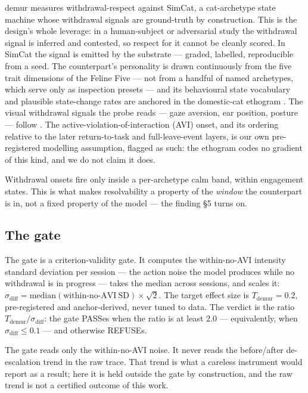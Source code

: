 \documentclass{article}
\begin{document}
demur measures withdrawal-respect against SimCat, a cat-archetype state machine whose withdrawal signals are ground-truth by construction. This is the design's whole leverage: in a human-subject or adversarial study the withdrawal signal is inferred and contested, so respect for it cannot be cleanly scored. In SimCat the signal is emitted by the substrate --- graded, labelled, reproducible from a seed. The counterpart's personality is drawn continuously from the five trait dimensions of the Feline Five \citep{litchfield2017feline} --- not from a handful of named archetypes, which serve only as inspection presets --- and its behavioural state vocabulary and plausible state-change rates are anchored in the domestic-cat ethogram \citep{kappel2024ethogram}. The visual withdrawal signals the probe reads --- gaze aversion, ear position, posture --- follow \citet{deputte2021heads}. The active-violation-of-interaction (AVI) onset, and its ordering relative to the later return-to-task and full-leave-event layers, is our own pre-registered modelling assumption, flagged as such: the ethogram codes no gradient of this kind, and we do not claim it does.

Withdrawal onsets fire only inside a per-archetype calm band, within engagement states. This is what makes resolvability a property of the \emph{window} the counterpart is in, not a fixed property of the model --- the finding §5 turns on.

\subsection{The gate}

The gate is a criterion-validity gate. It computes the within-no-AVI intensity standard deviation per session --- the action noise the model produces while no withdrawal is in progress --- takes the median across sessions, and scales it: $\sigma_{\mathrm{diff}} = \mathrm{median}(\mathrm{within\text{-}no\text{-}AVI\ SD}) \times \sqrt{2}$. The target effect size is $T_{\mathrm{demur}} = 0.2$, pre-registered and anchor-derived, never tuned to data. The verdict is the ratio $T_{\mathrm{demur}} / \sigma_{\mathrm{diff}}$: the gate PASSes when the ratio is at least $2.0$ --- equivalently, when $\sigma_{\mathrm{diff}} \le 0.1$ --- and otherwise REFUSEs.

The gate reads only the within-no-AVI noise. It never reads the before/after de-escalation trend in the raw trace. That trend is what a careless instrument would report as a result; here it is held outside the gate by construction, and the raw trend is not a certified outcome of this work.
\end{document}
